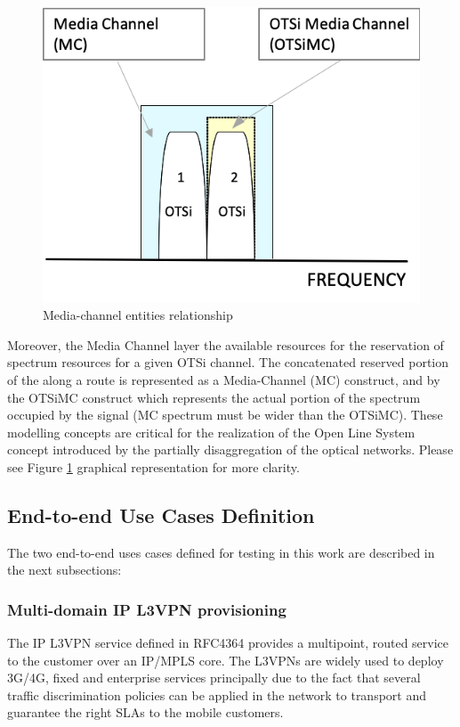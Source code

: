 \documentclass[a4paper,fleqn]{cas-dc}
\begin{document}
\begin{figure}
	\centering
		\includegraphics[scale=0.8]{figs/Media_channel.png}
	\caption{Media-channel entities relationship}
	\label{FIG:Media_channel}
\end{figure}

Moreover, the Media Channel layer the available resources for the reservation of  spectrum resources for a given OTSi channel. The concatenated reserved portion of the along a route is represented as a Media-Channel (MC) construct, and by the OTSiMC construct which represents the actual portion of the spectrum occupied by the signal (MC spectrum must be wider than the OTSiMC). These modelling concepts are critical for the realization of the Open Line System concept introduced by the partially disaggregation of the optical networks. Please see Figure \ref{FIG:Media_channel} graphical representation for more clarity.


\subsection{End-to-end Use Cases Definition}
The two end-to-end uses cases defined for testing in this work are described in the next subsections:

\subsubsection{Multi-domain IP L3VPN provisioning}
The IP L3VPN service defined in RFC4364 \cite{rfc4364} provides a multipoint, routed service to the customer over an IP/MPLS core. The L3VPNs are widely used to deploy 3G/4G, fixed and enterprise services principally due to the fact that several traffic discrimination policies can be applied in the network to transport and guarantee the right SLAs to the mobile customers.
\end{document}
